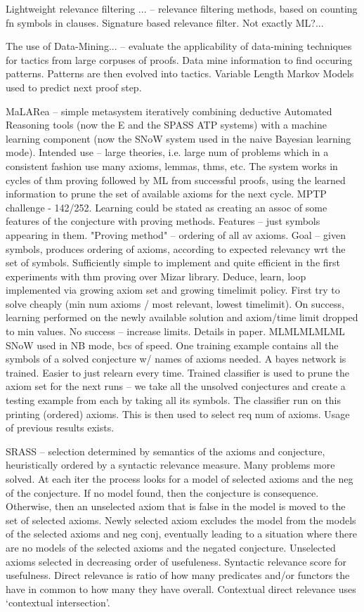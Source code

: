 \documentclass{article}
\begin{document}
Lightweight relevance filtering ... \cite{LightweightPaulson} -- relevance
filtering methods, based on counting fn symbols in clauses. Signature based
relevance filter. Not exactly ML?...

The use of Data-Mining... \cite{DataMiningAFT} -- evaluate the applicability of
data-mining techniques for tactics from large corpuses of proofs. Data mine
information to find occuring patterns. Patterns are then evolved into tactics.
Variable Length Markov Models used to predict next proof step.

MaLARea \cite{MaLARea} -- simple metasystem iteratively combining deductive
Automated Reasoning tools (now the E and the SPASS ATP systems) with a machine
learning component (now the SNoW system used in the  naive  Bayesian  learning
mode). Intended use -- large theories, i.e. large num of problems which in
a consistent fashion use many axioms, lemmas, thms, etc. The system works in
cycles of thm proving followed by ML from successful proofs, using the learned
information to prune the set of available axioms for the next cycle. MPTP
challenge - 142/252. Learning could be stated as creating an assoc of some
features of the conjecture with proving methods. Features -- just symbols
appearing in them. "Proving method" -- ordering of all av axioms. Goal -- given
symbols, produces ordering of axioms, according to expected relevancy wrt the
set of symbols. Sufficiently simple to implement and quite efficient in the
first experiments with thm proving over Mizar library. Deduce, learn, loop
implemented via growing axiom set and growing timelimit policy. First try to
solve cheaply (min num axioms / most relevant, lowest timelimit). On success,
learning performed on the newly available solution and axiom/time limit dropped
to min values. No success -- increase limits. Details in paper. MLMLMLMLML SNoW
used in NB mode, bcs of speed. One training example contains all the symbols of
a solved conjecture w/ names of axioms needed. A bayes network is trained.
Easier to just relearn every time. Trained classifier is used to prune the
axiom set for the next runs -- we take all the unsolved conjectures and create
a testing example from each by taking all its symbols. The classifier run on
this printing (ordered) axioms. This is then used to select req num of axioms.
Usage of previous results exists.

SRASS \cite{SRASS} -- selection determined by semantics of the axioms and
conjecture, heuristically ordered by a syntactic relevance measure. Many
problems more solved. At each iter the process looks for a model of selected
axioms and the neg of the conjecture. If no model found, then the conjecture is
consequence. Otherwise, then an unselected axiom that is false in the model is
moved to the set of selected axioms. Newly selected axiom excludes the model
from the models of the selected axioms and neg conj, eventually leading to
a situation where there are no models of the selected axioms and the negated
conjecture. Unselected axioms selected in decreasing order of usefuleness.
Syntactic relevance score for usefulness. Direct relevance is ratio of how many
predicates and/or functors the have in common to how many they have overall.
Contextual direct relevance uses `contextual intersection'.
\end{document}
